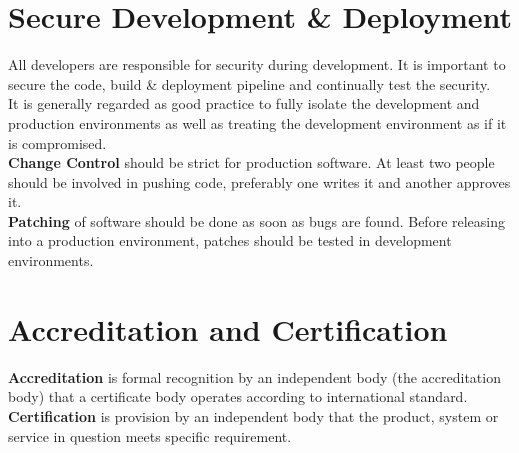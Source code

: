 \documentclass[a4paper,11pt]{article}
\begin{document}
\section{Secure Development \& Deployment}
All developers are responsible for security during development. It is important to secure the code, build \& deployment pipeline and continually test the security.\\
It is generally regarded as good practice to fully isolate the development and production environments as well as treating the development environment as if it is compromised.\\
\textbf{Change Control} should be strict for production software. At least two people should be involved in pushing code, preferably one writes it and another approves it.\\
\textbf{Patching} of software should be done as soon as bugs are found. Before releasing into a production environment, patches should be tested in development environments.

\section{Accreditation and Certification}
\textbf{Accreditation} is formal recognition by an independent body (the accreditation body) that a certificate body operates according to international standard.\\
\textbf{Certification} is provision by an independent body that the product, system or service in question meets specific requirement.
\end{document}
